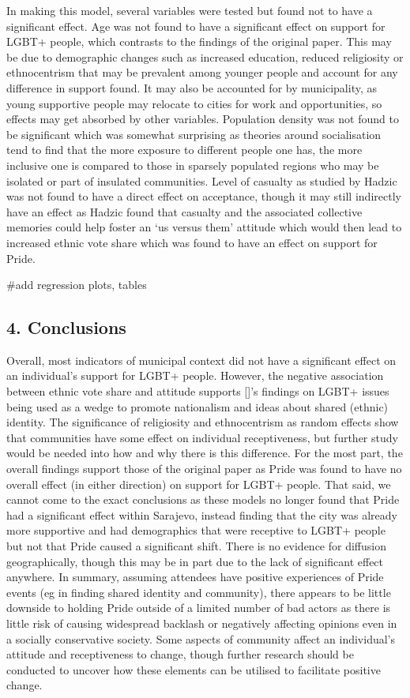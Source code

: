 \documentclass[
]{article}
\begin{document}
In making this model, several variables were tested but found not to
have a significant effect. Age was not found to have a significant
effect on support for LGBT+ people, which contrasts to the findings of
the original paper. This may be due to demographic changes such as
increased education, reduced religiosity or ethnocentrism that may be
prevalent among younger people and account for any difference in support
found. It may also be accounted for by municipality, as young supportive
people may relocate to cities for work and opportunities, so effects may
get absorbed by other variables. Population density was not found to be
significant which was somewhat surprising as theories around
socialisation tend to find that the more exposure to different people
one has, the more inclusive one is compared to those in sparsely
populated regions who may be isolated or part of insulated communities.
Level of casualty as studied by Hadzic was not found to have a direct
effect on acceptance, though it may still indirectly have an effect as
Hadzic found that casualty and the associated collective memories could
help foster an `us versus them' attitude which would then lead to
increased ethnic vote share which was found to have an effect on support
for Pride.

\#add regression plots, tables

\hypertarget{conclusions}{%
\subsection{4. Conclusions}\label{conclusions}}

Overall, most indicators of municipal context did not have a significant
effect on an individual's support for LGBT+ people. However, the
negative association between ethnic vote share and attitude supports
{[}{]}'s findings on LGBT+ issues being used as a wedge to promote
nationalism and ideas about shared (ethnic) identity. The significance
of religiosity and ethnocentrism as random effects show that communities
have some effect on individual receptiveness, but further study would be
needed into how and why there is this difference. For the most part, the
overall findings support those of the original paper as Pride was found
to have no overall effect (in either direction) on support for LGBT+
people. That said, we cannot come to the exact conclusions as these
models no longer found that Pride had a significant effect within
Sarajevo, instead finding that the city was already more supportive and
had demographics that were receptive to LGBT+ people but not that Pride
caused a significant shift. There is no evidence for diffusion
geographically, though this may be in part due to the lack of
significant effect anywhere. In summary, assuming attendees have
positive experiences of Pride events (eg in finding shared identity and
community), there appears to be little downside to holding Pride outside
of a limited number of bad actors as there is little risk of causing
widespread backlash or negatively affecting opinions even in a socially
conservative society. Some aspects of community affect an individual's
attitude and receptiveness to change, though further research should be
conducted to uncover how these elements can be utilised to facilitate
positive change.
\end{document}
